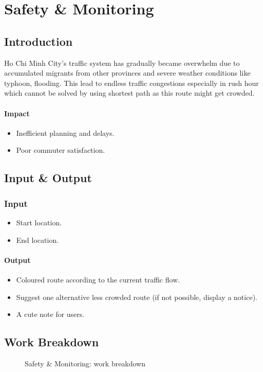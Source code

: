 \section{Safety \& Monitoring}
\subsection{Introduction}
Ho Chi Minh City’s traffic system has gradually became overwhelm due to accumulated migrants from other provinces and severe weather conditions like typhoon, flooding. This lead to endless traffic congestions especially in rush hour which cannot be solved by using shortest path as this route might get crowded.
\paragraph{Impact}
\begin{itemize}
  \item Inefficient planning and delays.
  \item Poor commuter satisfaction.
\end{itemize}   

\subsection{Input \& Output}
\subsubsection{Input}
\begin{itemize}
  \item Start location.
  \item End location.
\end{itemize}

\paragraph{Output}
\begin{itemize}
  \item Coloured route according to the current traffic flow.
  \item Suggest one alternative less crowded route (if not possible, display a notice).
  \item A cute note for users.
\end{itemize}

\subsection{Work Breakdown}
\begin{figure}[t]
  \centering
  \caption{Safety \& Monitoring: work breakdown}\label{fig:features-safety-breakdown}
\end{figure}

